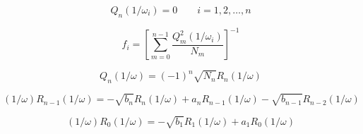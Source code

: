 \begin{equation}
  Q_n(1/\omega_i) = 0 \quad\quad i = 1,2,\dots ,n
\end{equation}



\begin{equation}
  f_i = \left[ \sum\limits_{m=0}^{n-1} \frac{Q_m^2(1/\omega_i)}{N_m} \right]^{-1}
\end{equation}


\begin{equation}
  Q_n(1/\omega) = (-1)^n \sqrt{N_n} R_n(1/\omega)
\end{equation}

\begin{equation}
  (1/\omega)R_{n-1}(1/\omega) = - \sqrt{b_n}R_n(1/\omega) + a_nR_{n-1}(1/\omega)
                                - \sqrt{b_{n-1}} R_{n-2}(1/\omega)
\end{equation}

\begin{equation}
  (1/\omega)R_0(1/\omega) = - \sqrt{b_1}R_1(1/\omega) + a_1 R_0(1/\omega)
\end{equation}

